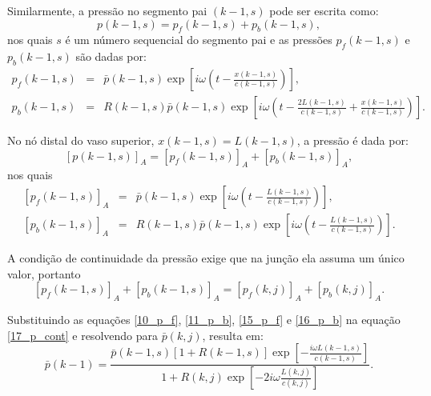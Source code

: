 \documentclass[
        english,			
        brazil			        %
        ,<...>]{abntbibufjf}
\begin{document}
Similarmente, a pressão no segmento pai $(k-1,s)$ pode ser escrita como:
\begin{equation}
p(k-1,s) =  p_f(k-1,s) + p_b (k-1,s),
\label{12_p|_f}
\end{equation}
nos quais $s$ é um número sequencial do segmento pai e as pressões $ p_f (k-1,s)$ e $p_b (k-1,s)$ são dadas por:
\begin{eqnarray}
p_f (k-1,s) &=& \bar{p}(k-1,s)\exp\left[i\omega \left(t - \frac{x(k-1,s)}{c (k-1,s)}\right) \right],\\
\label{13_p_f}
p_b (k-1,s) &=& R (k-1,s)\bar{p}(k-1,s)\exp\left[ i\omega \left( t - \frac{2L(k-1,s)}{c(k-1,s)} + \frac{x(k-1,s)}{c(k-1,s)}\right) \right]. \nonumber
\end{eqnarray}

No nó distal do vaso superior, $x(k-1,s) = L(k-1,s)$, a pressão é dada por:
\begin{equation}
\left[ p(k-1,s) \right]_A = \left[ p_f(k-1,s)\right]_A + \left[ p_b(k-1,s) \right]_A,
\label{13_p|_f}
\end{equation}
nos quais 
\begin{eqnarray}
\left[ p_f(k-1,s) \right]_A &=& \bar{p}(k-1,s)\exp\left[ i\omega \left(t - \frac{L(k-1,s)}{c(k-1,s)}\right)\right],
\label{15_p_f}
\\
\left[ p_b(k-1,s) \right]_A &=& R(k-1,s)\bar{p}(k-1,s)\exp\left[i\omega \left( t - \frac{L(k-1,s)}{c(k-1,s)} \right) \right]. 
\label{16_p_b}
\end{eqnarray}

A condição de continuidade da pressão exige que na junção ela assuma um único valor, portanto
\begin{equation}
\left[ p_f(k-1,s) \right]_A + \left[ p_b (k-1,s) \right]_A = \left[ p_f(k,j) \right]_A + \left[ p_b(k,j) \right]_A.
\label{17_p_cont}
\end{equation}

Substituindo as equações \eqref{10_p_f}, \eqref{11_p_b}, \eqref{15_p_f} e \eqref{16_p_b} na equação \eqref{17_p_cont} e resolvendo para $\bar{p}(k,j)$, resulta em:
\begin{equation}
\bar{p} (k-1) =  \frac{\bar{p}(k-1,s)\left[1 + R(k-1,s)\right] \exp\left[ -\frac{i \omega L(k-1,s)}{c(k-1,s)}\right]}{1 + R(k,j)\exp{\left[ -2i\omega \frac{L(k,j)}{c(k,j)}\right]}}.
\label{18_barp}
\end{equation}
\end{document}
